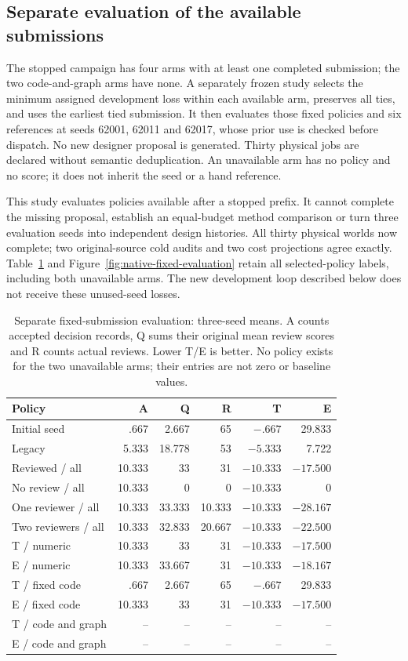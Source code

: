 \subsection{Separate evaluation of the available submissions}
The stopped campaign has four arms with at least one completed submission;
the two code-and-graph arms have none. A separately frozen study selects the
minimum assigned development loss within each available arm, preserves all
ties, and uses the earliest tied submission. It then evaluates those fixed
policies and six references at seeds 62001, 62011 and 62017, whose prior use is
checked before dispatch. No new designer proposal is generated. Thirty
physical jobs are declared without semantic deduplication. An unavailable arm
has no policy and no score; it does not inherit the seed or a hand reference.

This study evaluates policies available after a stopped prefix. It cannot
complete the missing proposal, establish an equal-budget method comparison or
turn three evaluation seeds into independent design histories. All thirty
physical worlds now complete; two original-source cold audits and two cost
projections agree exactly. Table~\ref{tab:native-fixed-evaluation} and
Figure~\ref{fig:native-fixed-evaluation} retain all selected-policy labels,
including both unavailable arms. The new development loop described below
does not receive these unused-seed losses.

\begin{table}[htbp]\centering\small
\caption{Separate fixed-submission evaluation: three-seed means. A counts
accepted decision records, Q sums their original mean review scores and R
counts actual reviews. Lower T/E is better. No policy exists for the two
unavailable arms; their entries are not zero or baseline values.}
\label{tab:native-fixed-evaluation}
\begin{tabular}{@{}lrrrrr@{}}
\toprule Policy & A & Q & R & T & E\\\midrule
Initial seed & .667 & 2.667 & 65 & $-.667$ & 29.833\\
Legacy & 5.333 & 18.778 & 53 & $-5.333$ & 7.722\\
Reviewed / all & 10.333 & 33 & 31 & $-10.333$ & $-17.500$\\
No review / all & 10.333 & 0 & 0 & $-10.333$ & 0\\
One reviewer / all & 10.333 & 33.333 & 10.333 & $-10.333$ & $-28.167$\\
Two reviewers / all & 10.333 & 32.833 & 20.667 & $-10.333$ & $-22.500$\\\midrule
T / numeric & 10.333 & 33 & 31 & $-10.333$ & $-17.500$\\
E / numeric & 10.333 & 33.667 & 31 & $-10.333$ & $-18.167$\\
T / fixed code & .667 & 2.667 & 65 & $-.667$ & 29.833\\
E / fixed code & 10.333 & 33 & 31 & $-10.333$ & $-17.500$\\
T / code and graph & -- & -- & -- & -- & --\\
E / code and graph & -- & -- & -- & -- & --\\\bottomrule
\end{tabular}\end{table}

